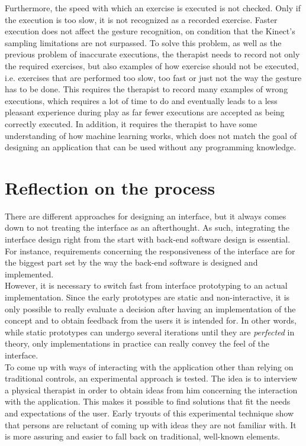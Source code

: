 Furthermore, the speed with which an exercise is executed is not checked. Only if the execution is too slow, it is not recognized as a recorded exercise. Faster execution does not affect the gesture recognition, on condition that the Kinect's sampling limitations are not surpassed. To solve this problem, as well as the previous problem of inaccurate executions, the therapist needs to record not only the required exercises, but also examples of how exercise should not be executed, i.e. exercises that are performed too slow, too fast or just not the way the gesture has to be done. This requires the therapist to record many examples of wrong executions, which requires a lot of time to do and eventually leads to a less pleasant experience during play as far fewer executions are accepted as being correctly executed. In addition, it requires the therapist to have some understanding of how machine learning works, which does not match the goal of designing an application that can be used without any programming knowledge.

\section{Reflection on the process}

There are different approaches for designing an interface, but it always comes down to not treating the interface as an afterthought. As such, integrating the interface design right from the start with back-end software design is essential. For instance, requirements concerning the responsiveness of the interface are for the biggest part set by the way the back-end software is designed and implemented.\\

However, it is necessary to switch fast from interface prototyping to an actual implementation. Since the early prototypes are static and non-interactive, it is only possible to really evaluate a decision after having an implementation of the concept and to obtain feedback from the users it is intended for. In other words, while static prototypes can undergo several iterations until they are \emph{perfected} in theory, only implementations in practice can really convey the feel of the interface.\\

To come up with ways of interacting with the application other than relying on traditional controls, an experimental approach is tested. The idea is to interview a physical therapist in order to obtain ideas from him concerning the interaction with the application. This makes it possible to find solutions that fit the needs and expectations of the user. Early tryouts of this experimental technique show that persons are reluctant of coming up with ideas they are not familiar with. It is more assuring and easier to fall back on traditional, well-known elements.\\

